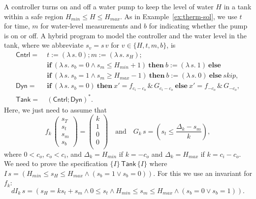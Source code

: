 \documentclass[envcountsame]{llncs}
\newcommand{\IF}[3]{\mathbf{if}\ #1\ \mathbf{then}\ #2\ \mathbf{else}\ #3}
\begin{document}
\begin{example}\label{ex:tank-inv}
A controller turns on and off a water pump to keep the level of water $H$ in a tank within a safe region $H_{min}\leq H\leq H_{max}$. As in Example~\ref{ex:therm-sol}, we use $t$ for time, $m$ for water-level measurements and $b$ for indicating whether the pump is on or off. A hybrid program to model the controller and the water level in the tank, where we abbreviate $s_v=s\, v$ for $v\in\{H,t,m,b\}$, is
\begin{align*}
	\mathsf{Cntrl} = &\ {t:=(\lambda\, s.\ 0)};{m:=(\lambda\, s.\ s_H)};\\
				&\ \IF {(\lambda\, s.\ s_b=0 \land s_m\leq H_{min} + 1)} {b:=(\lambda\, s.\ 1)} {}\\
				&\ \IF {(\lambda\, s.\ s_b=1 \land s_m\geq H_{max} - 1)} {b:=(\lambda\, s.\ 0)} {\mathit{skip}},\\
	\mathsf{Dyn} = &\ \IF {(\lambda\, s.\ s_b=0)} {x' = f_{c_i-c_o}\, \&\, G_{c_i-c_o}} {x' = f_{-c_o}\, \&\, G_{-c_o}},\\
	\mathsf{Tank} = &\ (\mathsf{Cntrl}{;}\mathsf{Dyn})^\ast.
\end{align*}
Here, we just need to assume that
 \begin{equation*}
    f_k\,
    \begin{pmatrix}
      s_T\\
      s_t\\
	s_m\\
	s_b
    \end{pmatrix}
=
\begin{pmatrix}
  k\\
  1\\
  0\\
  0\\
\end{pmatrix}\quad\text{and}\quad
G_k\, s = \left(s_t\leq \frac{\Delta_k-s_m}{k}\right),
\end{equation*}
where $0 < c_o$, $c_o < c_i$, and $\Delta_k=H_{min}$ if $k=-c_o$ and $\Delta_k = H_{max}$ if $k=c_i-c_o$. We need to prove the specification $\{I\}\, \mathsf{Tank}\, \{I\}$ where $I\, s=\left(H_{min}\leq s_H\leq H_{max}\land (s_b = 1 \lor s_b=0)\right)$. For this we use an invariant for $f_k$:
\begin{equation*}
dI_k\, s = \left(s_H=ks_t+s_m\land 0\leq s_t\land H_{min}\leq s_m\leq H_{max} \land (s_b=0\lor s_b=1)\right).
\end{equation*}


\end{example}
\end{document}
